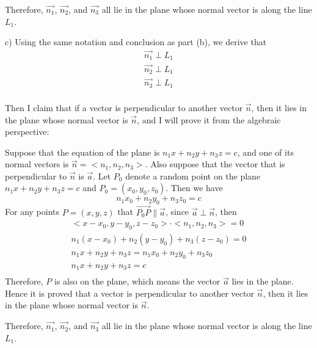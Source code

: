 \documentclass{article}
\begin{document}
Therefore, $\vec{n_1}$, $\vec{n_2}$, and $\vec{n_3}$ all lie in the plane whose 
normal vector is along the line $L_1$.

c) Using the same notation and conclusion as part (b), we derive that 
\begin{gather*}
  \vec{n_1} \perp L_1 \\
  \vec{n_2} \perp L_1 \\
  \vec{n_3} \perp L_1 \\
\end{gather*}

Then I claim that if a vector is perpendicular to another vector $\vec{n}$, then 
it lies in the plane whose normal vector is $\vec{n}$, and I will prove it from 
the algebraic perspective:

Suppose that the equation of the plane is $n_1x + n_2y + n_3z = c$, and one of 
its normal vectors is $\vec{n} = <n_1, n_2, n_3>$. Also suppose that the vector 
that is perpendicular to $\vec{n}$ is $\vec{a}$. Let $P_0$ denote a random point 
on the plane $n_1x + n_2y + n_3z = c$ and $P_0 = (x_0, y_0, z_0)$. Then we have
\begin{equation*}
  n_1x_0 + n_2y_0 + n_3z_0 = c
\end{equation*}
For any points $P = (x, y, z)$ that $\vec{P_0P} \parallel \vec{a}$, since 
$\vec{a} \perp \vec{n}$, then
\begin{gather*}
  <x - x_0, y - y_0, z - z_0> \cdot <n_1, n_2, n_3> = 0 \\
  n_1(x - x_0) + n_2(y - y_0) + n_3(z - z_0) = 0 \\
  n_1x + n_2y + n_3z = n_1x_0 + n_2y_0 + n_3z_0 \\
  n_1x + n_2y + n_3z = c \\
\end{gather*}
Therefore, $P$ is also on the plane, which means the vector $\vec{a}$ lies in 
the plane. Hence it is proved that a vector is perpendicular to another vector 
$\vec{n}$, then it lies in the plane whose normal vector is $\vec{n}$.

Therefore, $\vec{n_1}$, $\vec{n_2}$, and $\vec{n_3}$ all lie in the plane whose 
normal vector is along the line $L_1$.

\bigskip
\end{document}
